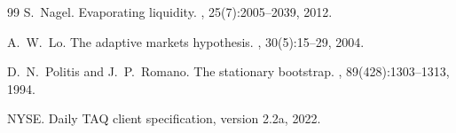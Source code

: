 \documentclass[10pt,conference,compsoc]{IEEEtran}
\begin{document}
\begin{thebibliography}{99}
S.~Nagel.
\newblock Evaporating liquidity.
, 25(7):2005--2039, 2012.

A.~W.~Lo.
\newblock The adaptive markets hypothesis.
, 30(5):15--29, 2004.

D.~N.~Politis and J.~P.~Romano.
\newblock The stationary bootstrap.
,
  89(428):1303--1313, 1994.

NYSE.
\newblock Daily TAQ client specification, version 2.2a, 2022.

\end{thebibliography}
\end{document}
